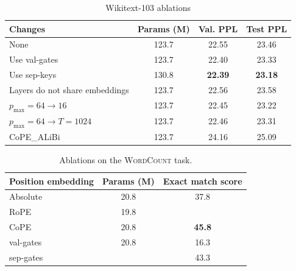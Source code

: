 \documentclass{article}
\newcommand{\ours}{CoPE\xspace}
\begin{document}
    

\begin{table}[h]
  \caption{Wikitext-103 ablations}
  \label{tab:wiki_abl}
  \centering
  \begin{tabular}{lccc}
    \toprule
    Changes   &  Params (M) & Val. PPL & Test PPL     \\
    \midrule
    None & 123.7 & 22.55 & 23.46 \\
    Use val-gates & 123.7 & 22.40 & 23.33 \\
    Use sep-keys & 130.8 & \bf 22.39 & \bf 23.18 \\
    Layers do not share embeddings  & 123.7 & 22.56 & 23.58 \\
    $p_\text{max}=64 \rightarrow 16$ & 123.7 & 22.45 & 23.22 \\
    $p_\text{max}=64 \rightarrow T=1024$ & 123.7 & 22.46 & 23.31 \\
    \ours{}\_ALiBi & 123.7 & 24.16 & 25.09 \\
    \bottomrule
  \end{tabular}
\end{table}

\begin{table}
  \caption{Ablations on the \textsc{WordCount} task.}
  \label{tab:wordcount_abl}
  \centering
  \begin{tabular}{lcc}
    \toprule
    Position embedding   &  Params (M) & Exact match score     \\
    \midrule
    Absolute & 20.8 & 37.8 \\
    RoPE & 19.8 &  \\
    \ours & 20.8 & \bf 45.8 \\
    \midrule
    val-gates &  20.8 & 16.3 \\
    sep-gates &  & 43.3 \\
    \bottomrule
  \end{tabular}
\end{table}
\fi
\end{document}
